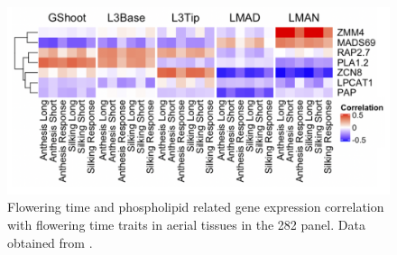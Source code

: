 \documentclass[9pt,twocolumn,twoside,lineno]{BioRxiv}
\begin{document}
\begin{figure}[t]
\begin{center}
\includegraphics[width=0.4\paperwidth]{Sup_Figures/Sup_Fig_8.png}
\caption{Flowering time and phospholipid related gene expression correlation with flowering time traits in aerial tissues in the 282 panel. 
Data obtained from \cite{Kremling2018-gn}.
}
\label{SupFig7}
\end{center}
\end{figure} 
\end{document}
